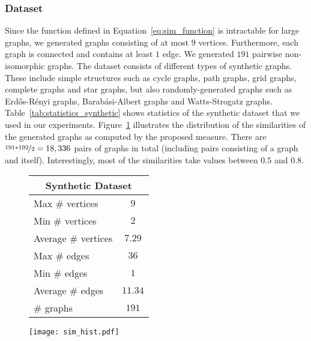 \documentclass[twoside,11pt]{article}
\begin{document}
\subsubsection{Dataset}
Since the function defined in Equation~\eqref{eq:sim_function} is intractable for large graphs, we generated graphs consisting of at most $9$ vertices.
Furthermore, each graph is connected and contains at least $1$ edge.
We generated $191$ pairwise non-isomorphic graphs.
The dataset consists of different types of synthetic graphs.
These include simple structures such as cycle graphs, path graphs, grid graphs, complete graphs and star graphs, but also randomly-generated graphs such as Erd{\H{o}}s-R{\'e}nyi graphs, Barab{\'a}si-Albert graphs and Watts-Strogatz graphs.
Table~\ref{tab:statistics_synthetic} shows statistics of the synthetic dataset that we used in our experiments.
Figure~\ref{fig:sim_distribution} illustrates the distribution of the similarities of the generated graphs as computed by the proposed measure.
There are $\nicefrac{191*192}{2} = 18,336$ pairs of graphs in total (including pairs consisting of a graph and itself).
Interestingly, most of the similarities take values between $0.5$ and $0.8$.

\begin{figure}[t]
    \begin{minipage}{0.4\linewidth}
        \centering
        \begin{tabular}{l|c} \hline
            \multicolumn{2}{c}{Synthetic Dataset} \\ \hline\hline
            Max \# vertices & $9$ \\
            Min \# vertices & $2$ \\
            Average \# vertices & $7.29$ \\ \hline
            Max \# edges & $36$ \\
            Min \# edges & $1$ \\
            Average \# edges & $11.34$ \\ \hline
            \# graphs & $191$ \\ \hline
        \end{tabular}
        \label{tab:statistics_synthetic}
    \end{minipage}
    \hfill
    \begin{minipage}{0.5\linewidth}
        \centering
        \texttt{[image: sim\_hist.pdf]}
        \label{fig:sim_distribution}
    \end{minipage}
    \vspace{-.6cm}
\end{figure}
\end{document}
